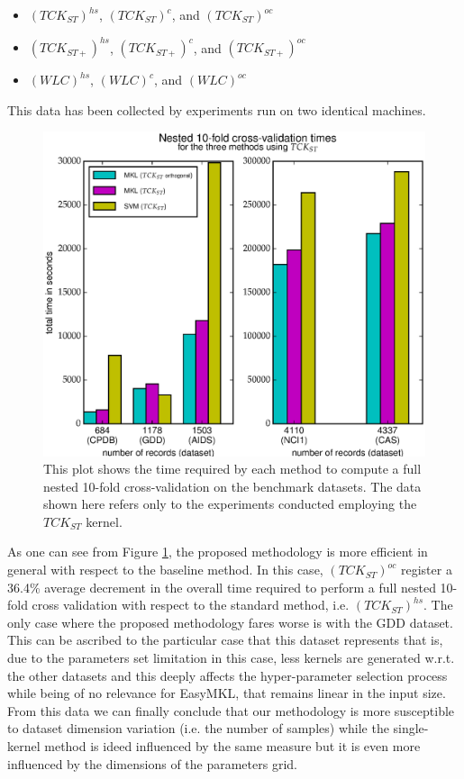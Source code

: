 \begin{itemize}
    \item $(TCK_{ST})^{hs}$, $(TCK_{ST})^c$, and $(TCK_{ST})^{oc}$
    \item $(TCK_{ST+})^{hs}$, $(TCK_{ST+})^c$, and $(TCK_{ST+})^{oc}$
    \item $(WLC)^{hs}$, $(WLC)^c$, and $(WLC)^{oc}$
\end{itemize}

This data has been collected by experiments run on two identical machines.

\begin{figure}[ht]
    \centering
    \includegraphics[scale=0.7]{Figures/total_times}
    \caption{
        This plot shows the time required by each method to compute a full nested 10-fold cross-validation on the benchmark datasets.
        The data shown here refers only to the experiments conducted employing the $TCK_{ST}$ kernel.
    }
    \label{fig:datasetstimes}
\end{figure}

As one can see from Figure \ref{fig:datasetstimes}, the proposed methodology is more
efficient in general with respect to the baseline method.
In this case, $(TCK_{ST})^{oc}$ register a 36.4\% average
decrement in the overall time required to perform a full nested 10-fold cross
validation with respect to the standard method, i.e. $(TCK_{ST})^{hs}$.
The only case where the proposed methodology fares worse is with the GDD dataset.
This can be ascribed to the particular case that this dataset represents that is, due to the parameters
set limitation in this case, less kernels are generated w.r.t. the other datasets
and this deeply affects the hyper-parameter selection process while being of no relevance for
EasyMKL, that remains linear in the input size.
From this data we can finally conclude that our methodology is more susceptible
to dataset dimension variation (i.e. the number of samples) while the single-kernel
method is ideed influenced by the same measure but it is even more influenced by
the dimensions of the parameters grid.

